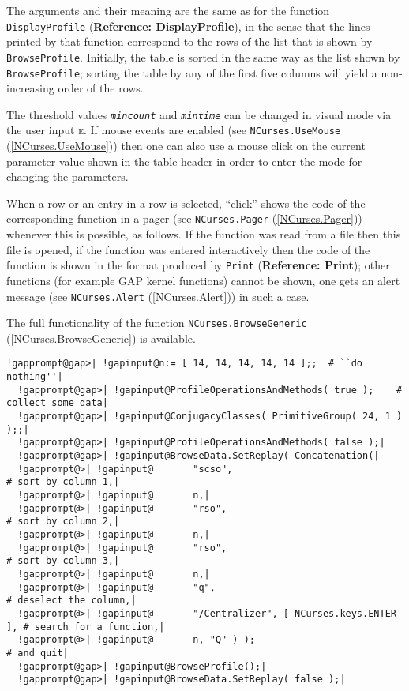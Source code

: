 \documentclass[a4paper,11pt]{report}
\begin{document}
{{{ The arguments and their meaning are the same as for the function \texttt{DisplayProfile} (\textbf{Reference: DisplayProfile}), in the sense that the lines printed by that function correspond to the rows
of the list that is shown by \texttt{BrowseProfile}. Initially, the table is sorted in the same way as the list shown by \texttt{BrowseProfile}; sorting the table by any of the first five columns will yield a
non-increasing order of the rows. 

 The threshold values \mbox{\texttt{\mdseries\slshape mincount}} and \mbox{\texttt{\mdseries\slshape mintime}} can be changed in visual mode via the user input \textsc{e}. If mouse events are enabled (see \texttt{NCurses.UseMouse} (\ref{NCurses.UseMouse})) then one can also use a mouse click on the current parameter value shown in
the table header in order to enter the mode for changing the parameters. 

 When a row or an entry in a row is selected, ``click'' shows the code of the corresponding function in a pager (see \texttt{NCurses.Pager} (\ref{NCurses.Pager})) whenever this is possible, as follows. If the function was read from a file
then this file is opened, if the function was entered interactively then the
code of the function is shown in the format produced by \texttt{Print} (\textbf{Reference: Print}); other functions (for example \textsf{GAP} kernel functions) cannot be shown, one gets an alert message (see \texttt{NCurses.Alert} (\ref{NCurses.Alert})) in such a case. 

 The full functionality of the function \texttt{NCurses.BrowseGeneric} (\ref{NCurses.BrowseGeneric}) is available. 

 
\begin{Verbatim}[commandchars=!@|,fontsize=\small,frame=single,label=Example]
  !gapprompt@gap>| !gapinput@n:= [ 14, 14, 14, 14, 14 ];;  # ``do nothing''|
  !gapprompt@gap>| !gapinput@ProfileOperationsAndMethods( true );    # collect some data|
  !gapprompt@gap>| !gapinput@ConjugacyClasses( PrimitiveGroup( 24, 1 ) );;|
  !gapprompt@gap>| !gapinput@ProfileOperationsAndMethods( false );|
  !gapprompt@gap>| !gapinput@BrowseData.SetReplay( Concatenation(|
  !gapprompt@>| !gapinput@       "scso",                                 # sort by column 1,|
  !gapprompt@>| !gapinput@       n,|
  !gapprompt@>| !gapinput@       "rso",                                  # sort by column 2,|
  !gapprompt@>| !gapinput@       n,|
  !gapprompt@>| !gapinput@       "rso",                                  # sort by column 3,|
  !gapprompt@>| !gapinput@       n,|
  !gapprompt@>| !gapinput@       "q",                                    # deselect the column,|
  !gapprompt@>| !gapinput@       "/Centralizer", [ NCurses.keys.ENTER ], # search for a function,|
  !gapprompt@>| !gapinput@       n, "Q" ) );                             # and quit|
  !gapprompt@gap>| !gapinput@BrowseProfile();|
  !gapprompt@gap>| !gapinput@BrowseData.SetReplay( false );|
\end{Verbatim}
 

}}}
\end{document}
